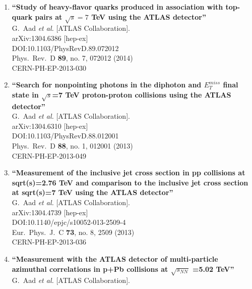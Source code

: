 \documentclass{article}
\begin{document}
\begin{enumerate}
\item%
{\bf ``Study of heavy-flavor quarks produced in association with top-quark pairs at $\sqrt{s}=7$  TeV using the ATLAS detector''}
  \\{}G.~Aad {\it et al.} [ATLAS Collaboration].
  \\{}arXiv:1304.6386 [hep-ex]
  \\{}DOI:10.1103/PhysRevD.89.072012
  \\{}Phys.\ Rev.\ D {\bf 89}, no. 7, 072012 (2014)
  \\{}CERN-PH-EP-2013-030
\item%
{\bf ``Search for nonpointing photons in the diphoton and $E^{miss}_T$ final state in $\sqrt{s}$=7  TeV proton-proton collisions using the ATLAS detector''}
  \\{}G.~Aad {\it et al.} [ATLAS Collaboration].
  \\{}arXiv:1304.6310 [hep-ex]
  \\{}DOI:10.1103/PhysRevD.88.012001
  \\{}Phys.\ Rev.\ D {\bf 88}, no. 1, 012001 (2013)
  \\{}CERN-PH-EP-2013-049
\item%
{\bf ``Measurement of the inclusive jet cross section in pp collisions at sqrt(s)=2.76 TeV and comparison to the inclusive jet cross section at sqrt(s)=7 TeV using the ATLAS detector''}
  \\{}G.~Aad {\it et al.} [ATLAS Collaboration].
  \\{}arXiv:1304.4739 [hep-ex]
  \\{}DOI:10.1140/epjc/s10052-013-2509-4
  \\{}Eur.\ Phys.\ J.\ C {\bf 73}, no. 8, 2509 (2013)
  \\{}CERN-PH-EP-2013-036
\item%
{\bf ``Measurement with the ATLAS detector of multi-particle azimuthal correlations in p+Pb collisions at $\sqrt{s_{NN}}$ =5.02 TeV''}
  \\{}G.~Aad {\it et al.} [ATLAS Collaboration].

\end{enumerate}
\end{document}
